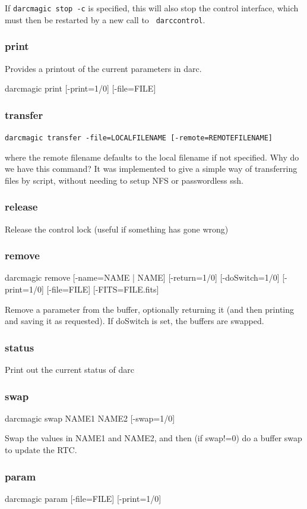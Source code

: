 \documentclass[a4,10pt]{article}
\begin{document}
If {\tt darcmagic stop -c} is specified, this will also stop the
control interface, which must then be restarted by a new call to {\tt
  darccontrol}.

\subsubsection{print}
Provides a printout of the current parameters in darc.

darcmagic print [-print=1/0] [-file=FILE]



\subsubsection{transfer}
{\tt darcmagic transfer -file=LOCALFILENAME [-remote=REMOTEFILENAME]}

where the remote filename defaults to the local filename if not
specified.  Why do we have this command?  It was implemented to give a
simple way of transferring files by script, without needing to setup
NFS or passwordless ssh.


\subsubsection{release}
Release the control lock (useful if something has gone wrong)

\subsubsection{remove}
darcmagic remove [-name=NAME | NAME] [-return=1/0] [-doSwitch=1/0]
[-print=1/0] [-file=FILE] [-FITS=FILE.fits]

Remove a parameter from the buffer, optionally returning it (and then
printing and saving it as requested).  If doSwitch is set, the buffers
are swapped.

\subsubsection{status}
Print out the current status of darc
\subsubsection{swap}
darcmagic swap NAME1 NAME2 [-swap=1/0]

Swap the values in NAME1 and NAME2, and then (if swap!=0) do a buffer
swap to update the RTC.

\subsubsection{param}
darcmagic param [-file=FILE] [-print=1/0]
\end{document}
